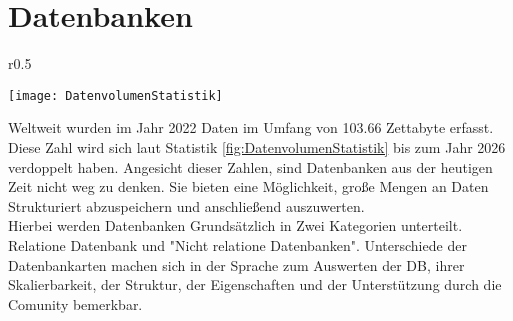 \section{Datenbanken}\label{sec:Datenbank}
\begin{wrapfigure}{r}{0.5\textwidth}
    \vspace{-1.2cm}
    \begin{center}
      \texttt{[image: DatenvolumenStatistik]}
    \end{center}
    \vspace{-0.5cm}
    \caption{Volumen der weltweit generierten Daten bis 2027 \cite{Datenmengen}}
    \label{fig:DatenvolumenStatistik}
    \vspace{-0.5cm}
  \end{wrapfigure}
Weltweit wurden im Jahr 2022 Daten im Umfang von 103.66 Zettabyte erfasst. Diese Zahl wird sich laut Statistik \ref{fig:DatenvolumenStatistik} bis zum Jahr 2026 verdoppelt haben. Angesicht dieser Zahlen, sind Datenbanken aus der heutigen Zeit nicht weg zu denken. Sie bieten eine Möglichkeit, große Mengen an Daten Strukturiert abzuspeichern und anschließend auszuwerten.\\
Hierbei werden Datenbanken Grundsätzlich in Zwei Kategorien unterteilt. Relatione Datenbank und "Nicht relatione Datenbanken". Unterschiede der Datenbankarten machen sich in der Sprache zum Auswerten der DB, ihrer Skalierbarkeit, der Struktur, der Eigenschaften und der Unterstützung durch die Comunity bemerkbar. 

